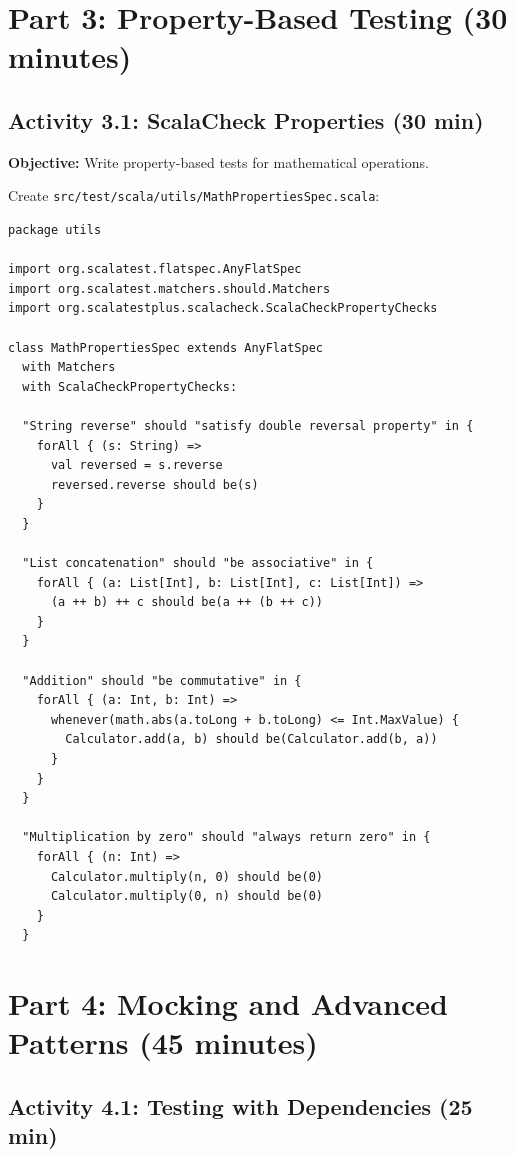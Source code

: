 \documentclass[12pt,a4paper]{article}
\begin{document}
\section{Part 3: Property-Based Testing (30 minutes)}

\subsection{Activity 3.1: ScalaCheck Properties (30 min)}

\textbf{Objective:} Write property-based tests for mathematical operations.

Create \texttt{src/test/scala/utils/MathPropertiesSpec.scala}:

\begin{lstlisting}
package utils

import org.scalatest.flatspec.AnyFlatSpec
import org.scalatest.matchers.should.Matchers
import org.scalatestplus.scalacheck.ScalaCheckPropertyChecks

class MathPropertiesSpec extends AnyFlatSpec 
  with Matchers 
  with ScalaCheckPropertyChecks:
  
  "String reverse" should "satisfy double reversal property" in {
    forAll { (s: String) =>
      val reversed = s.reverse
      reversed.reverse should be(s)
    }
  }
  
  "List concatenation" should "be associative" in {
    forAll { (a: List[Int], b: List[Int], c: List[Int]) =>
      (a ++ b) ++ c should be(a ++ (b ++ c))
    }
  }
  
  "Addition" should "be commutative" in {
    forAll { (a: Int, b: Int) =>
      whenever(math.abs(a.toLong + b.toLong) <= Int.MaxValue) {
        Calculator.add(a, b) should be(Calculator.add(b, a))
      }
    }
  }
  
  "Multiplication by zero" should "always return zero" in {
    forAll { (n: Int) =>
      Calculator.multiply(n, 0) should be(0)
      Calculator.multiply(0, n) should be(0)
    }
  }
\end{lstlisting}

\section{Part 4: Mocking and Advanced Patterns (45 minutes)}

\subsection{Activity 4.1: Testing with Dependencies (25 min)}
\end{document}

